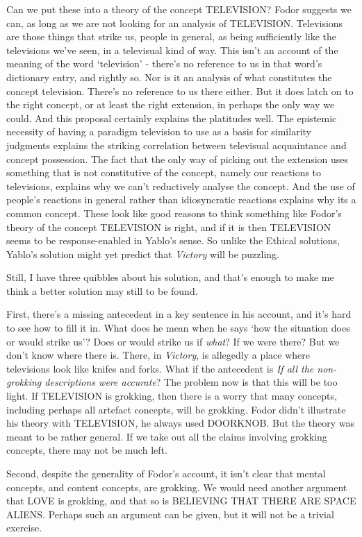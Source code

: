 \documentclass[
  11pt,
  letterpaper,
  DIV=11,
  numbers=noendperiod,
  twoside]{scrartcl}
\begin{document}
Can we put these into a theory of the concept TELEVISION? Fodor suggests
we can, as long as we are not looking for an analysis of TELEVISION.
Televisions are those things that strike us, people in general, as being
sufficiently like the televisions we've seen, in a televisual kind of
way. This isn't an account of the meaning of the word `television' -
there's no reference to us in that word's dictionary entry, and rightly
so. Nor is it an analysis of what constitutes the concept television.
There's no reference to us there either. But it does latch on to the
right concept, or at least the right extension, in perhaps the only way
we could. And this proposal certainly explains the platitudes well. The
epistemic necessity of having a paradigm television to use as a basis
for similarity judgments explains the striking correlation between
televisual acquaintance and concept possession. The fact that the only
way of picking out the extension uses something that is not constitutive
of the concept, namely our reactions to televisions, explains why we
can't reductively analyse the concept. And the use of people's reactions
in general rather than idiosyncratic reactions explains why its a common
concept. These look like good reasons to think something like Fodor's
theory of the concept TELEVISION is right, and if it is then TELEVISION
seems to be response-enabled in Yablo's sense. So unlike the Ethical
solutions, Yablo's solution might yet predict that \emph{Victory} will
be puzzling.

Still, I have three quibbles about his solution, and that's enough to
make me think a better solution may still to be found.

First, there's a missing antecedent in a key sentence in his account,
and it's hard to see how to fill it in. What does he mean when he says
`how the situation does or would strike us'? Does or would strike us if
\emph{what}? If we were there? But we don't know where there is. There,
in \emph{Victory}, is allegedly a place where televisions look like
knifes and forks. What if the antecedent is \emph{If all the
non-grokking descriptions were accurate}? The problem now is that this
will be too light. If TELEVISION is grokking, then there is a worry that
many concepts, including perhaps all artefact concepts, will be
grokking. Fodor didn't illustrate his theory with TELEVISION, he always
used DOORKNOB. But the theory was meant to be rather general. If we take
out all the claims involving grokking concepts, there may not be much
left.

Second, despite the generality of Fodor's account, it isn't clear that
mental concepts, and content concepts, are grokking. We would need
another argument that LOVE is grokking, and that so is BELIEVING THAT
THERE ARE SPACE ALIENS. Perhaps such an argument can be given, but it
will not be a trivial exercise.
\end{document}
